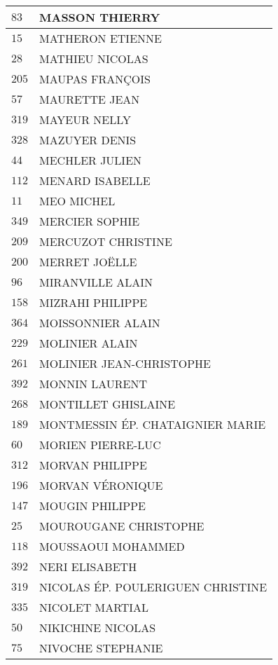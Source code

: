 \begin{xltabular}{\linewidth}{|l|X|}
    \hline
    $83$ & MASSON THIERRY \\
    \hline
    $15$ & MATHERON ETIENNE \\
    \hline
    $28$ & MATHIEU NICOLAS \\
    \hline
    $205$ & MAUPAS FRANÇOIS \\
    \hline
    $57$ & MAURETTE JEAN \\
    \hline
    $319$ & MAYEUR NELLY \\
    \hline
    $328$ & MAZUYER DENIS \\
    \hline
    $44$ & MECHLER JULIEN \\
    \hline
    $112$ & MENARD ISABELLE \\
    \hline
    $11$ & MEO MICHEL \\
    \hline
    $349$ & MERCIER SOPHIE \\
    \hline
    $209$ & MERCUZOT CHRISTINE \\
    \hline
    $200$ & MERRET JOËLLE \\
    \hline
    $96$ & MIRANVILLE ALAIN \\
    \hline
    $158$ & MIZRAHI PHILIPPE \\
    \hline
    $364$ & MOISSONNIER ALAIN \\
    \hline
    $229$ & MOLINIER ALAIN \\
    \hline
    $261$ & MOLINIER JEAN-CHRISTOPHE \\
    \hline
    $392$ & MONNIN LAURENT \\
    \hline
    $268$ & MONTILLET GHISLAINE \\
    \hline
    $189$ & MONTMESSIN ÉP. CHATAIGNIER MARIE \\
    \hline
    $60$ & MORIEN PIERRE-LUC \\
    \hline
    $312$ & MORVAN PHILIPPE \\
    \hline
    $196$ & MORVAN VÉRONIQUE \\
    \hline
    $147$ & MOUGIN PHILIPPE \\
    \hline
    $25$ & MOUROUGANE CHRISTOPHE \\
    \hline
    $118$ & MOUSSAOUI MOHAMMED \\
    \hline
    $392$ & NERI ELISABETH \\
    \hline
    $319$ & NICOLAS ÉP. POULERIGUEN CHRISTINE \\
    \hline
    $335$ & NICOLET MARTIAL \\
    \hline
    $50$ & NIKICHINE NICOLAS \\
    \hline
    $75$ & NIVOCHE STEPHANIE \\

\end{xltabular}
